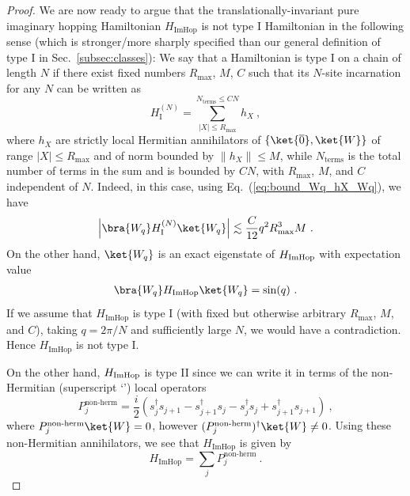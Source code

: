 \documentclass[prx,letterpaper,aps,superscriptaddress,floatfix,twocolumn,nofootinbib]{revtex4-2}
\theoremstyle{definition}
\newcommand{\ktO}{\ket{\overline{0}}}
\newcommand{\ktW}{\ket{W}}
\begin{document}
\begin{proof}
%
We are now ready to argue that the translationally-invariant pure imaginary hopping Hamiltonian $H_{\text{ImHop}}$ is not type I Hamiltonian in the following sense (which is stronger/more sharply specified than our general definition of type I in Sec.~\ref{subsec:classes}):
%
We say that a Hamiltonian is type I on a chain of length $N$ if there exist fixed numbers $R_{\text{max}}$, $M$, $C$ such that its $N$-site incarnation for any $N$ can be written as 
\begin{equation}
H_{\text{I}}^{(N)} = \sum_{|X| \leq R_{\text{max}}}^{N_{\text{terms}} \leq C N} h_X ~,
\end{equation}
where $h_X$ are strictly local Hermitian annihilators of $\{ \ktO, \ktW \}$ of range $|X| \leq R_{\text{max}}$ and of norm bounded by $\|h_X\| \leq M$, while $N_{\text{terms}}$ is the total number of terms in the sum and is bounded by $C N$, with $R_{\text{max}}$, $M$, and $C$ independent of $N$.
%
Indeed, in this case, using Eq.~(\ref{eq:bound_Wq_hX_Wq}), we have
\begin{align}
\left| \bra{W_q} H_{\rm I}^{(N)} \ket{W_q} \right| \lesssim \frac{C}{12} q^2 R_{\text{max}}^3 M ~.
\label{eq:limitHIWq}
\end{align}
%
On the other hand, $\ket{W_q}$ is an exact eigenstate of $H_{\rm ImHop}$ with expectation value
\begin{align}
\bra{W_q} H_{\rm ImHop} \ket{W_q} = \sin(q) ~.
\end{align}
If we assume that $H_{\text{ImHop}}$ is type I (with fixed but otherwise arbitrary $R_{\text{max}}$, $M$, and $C$), taking $q = 2\pi/N$ and sufficiently large $N$, we would have a contradiction.
Hence $H_{\text{ImHop}}$ is not type I.
%

%
On the other hand, $H_{\rm ImHop}$ is type II since we can write it in terms of the non-Hermitian (superscript `') local operators
\begin{equation}
P_j^{\text{non-herm}} = \frac{i}{2} (s_j^\dag s_{j+1} -  s_{j+1}^\dag s_j -  s_j^\dag s_j +  s_{j+1}^\dag s_{j+1}) ~,\end{equation}
where $P_j^{\text{non-herm}} \ket{W} = 0$, however $(P_j^{\text{non-herm}})^\dag \ktW \neq 0$.
Using these non-Hermitian annihilators, we see that $H_{\text{ImHop}}$ is given by
\begin{equation}
H_{\text{ImHop}}= \sum_j P_j^{\text{non-herm}} ~.
\end{equation}

\end{proof}
\end{document}
